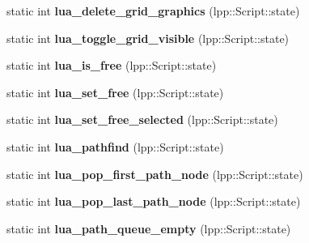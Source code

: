 \begin{DoxyCompactItemize}
\item 
static int {\bfseries lua\+\_\+delete\+\_\+grid\+\_\+graphics} (lpp\+::\+Script\+::state)\hypertarget{class_lua_interface_a3328be00237263d8d205d982b0b0af02}{}\label{class_lua_interface_a3328be00237263d8d205d982b0b0af02}

\item 
static int {\bfseries lua\+\_\+toggle\+\_\+grid\+\_\+visible} (lpp\+::\+Script\+::state)\hypertarget{class_lua_interface_a924e81c305fc851909b767dfb11e0ccb}{}\label{class_lua_interface_a924e81c305fc851909b767dfb11e0ccb}

\item 
static int {\bfseries lua\+\_\+is\+\_\+free} (lpp\+::\+Script\+::state)\hypertarget{class_lua_interface_a9ee8bd45691f1d8e59e345ef09da92e9}{}\label{class_lua_interface_a9ee8bd45691f1d8e59e345ef09da92e9}

\item 
static int {\bfseries lua\+\_\+set\+\_\+free} (lpp\+::\+Script\+::state)\hypertarget{class_lua_interface_ab5231ccc2a7ac626c5a1f4263a58a2fc}{}\label{class_lua_interface_ab5231ccc2a7ac626c5a1f4263a58a2fc}

\item 
static int {\bfseries lua\+\_\+set\+\_\+free\+\_\+selected} (lpp\+::\+Script\+::state)\hypertarget{class_lua_interface_ab0133636fa8e7a5bb6002c0c3647c61f}{}\label{class_lua_interface_ab0133636fa8e7a5bb6002c0c3647c61f}

\item 
static int {\bfseries lua\+\_\+pathfind} (lpp\+::\+Script\+::state)\hypertarget{class_lua_interface_a30da98013804d88f57cb2ba90328d95a}{}\label{class_lua_interface_a30da98013804d88f57cb2ba90328d95a}

\item 
static int {\bfseries lua\+\_\+pop\+\_\+first\+\_\+path\+\_\+node} (lpp\+::\+Script\+::state)\hypertarget{class_lua_interface_a9555021373b2d62497bbfc3588c0482e}{}\label{class_lua_interface_a9555021373b2d62497bbfc3588c0482e}

\item 
static int {\bfseries lua\+\_\+pop\+\_\+last\+\_\+path\+\_\+node} (lpp\+::\+Script\+::state)\hypertarget{class_lua_interface_ae43ba25d7eef092eee288a9e72050217}{}\label{class_lua_interface_ae43ba25d7eef092eee288a9e72050217}

\item 
static int {\bfseries lua\+\_\+path\+\_\+queue\+\_\+empty} (lpp\+::\+Script\+::state)\hypertarget{class_lua_interface_a416c19157e87027938a479fd32ff8ba1}{}\label{class_lua_interface_a416c19157e87027938a479fd32ff8ba1}


\end{DoxyCompactItemize}
